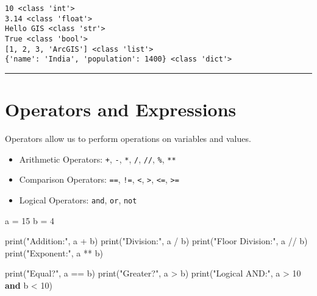 \documentclass[
  11pt,
  letterpaper,
]{book}
\newenvironment{Shaded}{\begin{snugshade}}{\end{snugshade}}
\newcommand{\BuiltInTok}[1]{\textcolor[rgb]{0.00,0.23,0.31}{#1}}
\newcommand{\DecValTok}[1]{\textcolor[rgb]{0.68,0.00,0.00}{#1}}
\newcommand{\KeywordTok}[1]{\textcolor[rgb]{0.00,0.23,0.31}{\textbf{#1}}}
\newcommand{\NormalTok}[1]{\textcolor[rgb]{0.00,0.23,0.31}{#1}}
\newcommand{\OperatorTok}[1]{\textcolor[rgb]{0.37,0.37,0.37}{#1}}
\newcommand{\StringTok}[1]{\textcolor[rgb]{0.13,0.47,0.30}{#1}}
\providecommand{\tightlist}{%
  \setlength{\itemsep}{0pt}\setlength{\parskip}{0pt}}
\begin{document}
\begin{verbatim}
10 <class 'int'>
3.14 <class 'float'>
Hello GIS <class 'str'>
True <class 'bool'>
[1, 2, 3, 'ArcGIS'] <class 'list'>
{'name': 'India', 'population': 1400} <class 'dict'>
\end{verbatim}

\begin{center}\rule{0.5\linewidth}{0.5pt}\end{center}

\section{Operators and Expressions}\label{operators-and-expressions}

Operators allow us to perform operations on variables and values.

\begin{itemize}
\tightlist
\item
  Arithmetic Operators: \texttt{+}, \texttt{-}, \texttt{*}, \texttt{/},
  \texttt{//}, \texttt{\%}, \texttt{**}\\
\item
  Comparison Operators: \texttt{==}, \texttt{!=}, \texttt{\textless{}},
  \texttt{\textgreater{}}, \texttt{\textless{}=},
  \texttt{\textgreater{}=}\\
\item
  Logical Operators: \texttt{and}, \texttt{or}, \texttt{not}
\end{itemize}

\begin{Shaded}
\begin{Highlighting}[]
\NormalTok{a }\OperatorTok{=} \DecValTok{15}
\NormalTok{b }\OperatorTok{=} \DecValTok{4}

\BuiltInTok{print}\NormalTok{(}\StringTok{"Addition:"}\NormalTok{, a }\OperatorTok{+}\NormalTok{ b)}
\BuiltInTok{print}\NormalTok{(}\StringTok{"Division:"}\NormalTok{, a }\OperatorTok{/}\NormalTok{ b)}
\BuiltInTok{print}\NormalTok{(}\StringTok{"Floor Division:"}\NormalTok{, a }\OperatorTok{//}\NormalTok{ b)}
\BuiltInTok{print}\NormalTok{(}\StringTok{"Exponent:"}\NormalTok{, a }\OperatorTok{**}\NormalTok{ b)}

\BuiltInTok{print}\NormalTok{(}\StringTok{"Equal?"}\NormalTok{, a }\OperatorTok{==}\NormalTok{ b)}
\BuiltInTok{print}\NormalTok{(}\StringTok{"Greater?"}\NormalTok{, a }\OperatorTok{\textgreater{}}\NormalTok{ b)}
\BuiltInTok{print}\NormalTok{(}\StringTok{"Logical AND:"}\NormalTok{, a }\OperatorTok{\textgreater{}} \DecValTok{10} \KeywordTok{and}\NormalTok{ b }\OperatorTok{\textless{}} \DecValTok{10}\NormalTok{)}
\end{Highlighting}
\end{Shaded}
\end{document}
